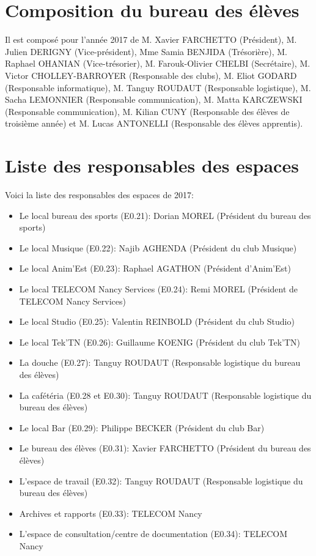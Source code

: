 \documentclass{article} %
\begin{document}
	\section*{Composition du bureau des élèves}
		
		Il est composé pour l’année 2017 de M. Xavier FARCHETTO (Président), M.
		Julien DERIGNY (Vice-président), Mme Samia BENJIDA (Trésorière), M.
		Raphael OHANIAN (Vice-trésorier), M. Farouk-Olivier CHELBI (Secrétaire), M. Victor
		CHOLLEY-BARROYER (Responsable des clubs), M. Eliot GODARD (Responsable
		informatique), M. Tanguy ROUDAUT (Responsable logistique), M. Sacha
		LEMONNIER (Responsable communication), M. Matta KARCZEWSKI
		(Responsable communication), M. Kilian CUNY (Responsable des élèves
		de troisième année) et M. Lucas ANTONELLI (Responsable des élèves apprentis).

	\section*{Liste des responsables des espaces}

		Voici la liste des responsables des espaces de 2017:
		\begin{itemize}
			\item Le local bureau des sports (E0.21): Dorian MOREL (Président
				du bureau des sports)
			\item Le local Musique (E0.22): Najib AGHENDA (Président du club
				Musique)
			\item Le local Anim’Est (E0.23): Raphael AGATHON (Président
				d’Anim’Est)
			\item Le local TELECOM Nancy Services (E0.24): Remi MOREL (Président
				de TELECOM Nancy Services)
			\item Le local Studio (E0.25): Valentin REINBOLD (Président du club
				Studio)
			\item Le local Tek’TN (E0.26): Guillaume KOENIG (Président du club
				Tek’TN)
			\item La douche (E0.27): Tanguy ROUDAUT (Responsable logistique du
				bureau des élèves)
			\item La cafétéria (E0.28 et E0.30): Tanguy ROUDAUT (Responsable
				logistique du bureau des élèves)
			\item Le local Bar (E0.29): Philippe BECKER (Président du club Bar)
			\item Le bureau des élèves (E0.31): Xavier FARCHETTO (Président du
				bureau des élèves)
			\item L’espace de travail (E0.32): Tanguy ROUDAUT (Responsable
				logistique du bureau des élèves)
			\item Archives et rapports (E0.33): TELECOM Nancy
			\item L'espace de consultation/centre de documentation (E0.34):
				TELECOM Nancy
		\end{itemize}
\end{document}
